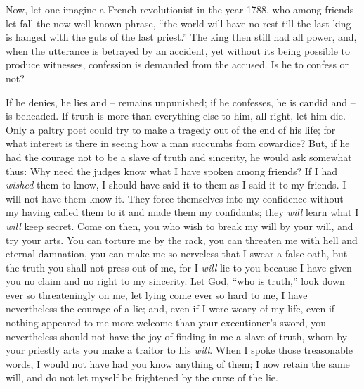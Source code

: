 \documentclass[12pt,a4paper]{book}
\begin{document}
Now, let one imagine a French revolutionist in the year 1788, who among 
friends let fall the now well-known phrase, ``the world will have no rest 
till the last king is hanged with the guts of the last priest.'' The king 
then still had all power, and, when the utterance is betrayed by an accident, 
yet without its being possible to produce witnesses, confession is demanded 
from the accused. Is he to confess or not?

If he denies, he lies and -- remains unpunished; if he confesses, he is candid 
and -- is beheaded. If truth is more than everything else to him, all right, 
let him die. Only a paltry poet could try to make a tragedy out of the end of 
his life; for what interest is there in seeing how a man succumbs from 
cowardice? But, if he had the courage not to be a slave of truth and 
sincerity, he would ask somewhat thus: Why need the judges know what I have 
spoken among friends? If I had \textit{wished} them to know, I should have 
said it to them as I said it to my friends. I will not have them know it. They 
force themselves into my confidence without my having called them to it and 
made them my confidants; they \textit{will} learn what I \textit{will} keep 
secret. Come on then, you who wish to break my will by your will, and try your 
arts. You can torture me by the rack, you can threaten me with hell and 
eternal damnation, you can make me so nerveless that I swear a false oath, but 
the truth you shall not press out of me, for I \textit{will} lie to you 
because I have given you no claim and no right to my sincerity. Let God, 
``who is truth,'' look down ever so threateningly on me, let lying come ever 
so hard to me, I have nevertheless the courage of a lie; and, even if I were 
weary of my life, even if nothing appeared to me more welcome than your 
executioner's sword, you nevertheless should not have the joy of finding in me 
a slave of truth, whom by your priestly arts you make a traitor to his 
\textit{will}. When I spoke those treasonable words, I would not have had you 
know anything of them; I now retain the same will, and do not let myself be 
frightened by the curse of the lie.
\end{document}
